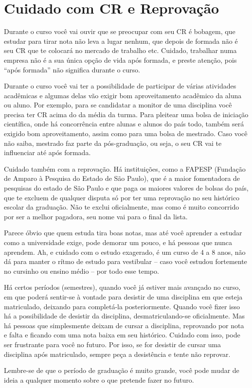 
\section{Cuidado com CR e Reprovação}

Durante o curso você vai ouvir que se preocupar com seu CR é bobagem, que
estudar para tirar nota não leva a lugar nenhum, que depois de formada não é
seu CR que te colocará no mercado de trabalho etc. Cuidado, trabalhar numa
empresa não é a sua única opção de vida após formada, e preste atenção, pois
``após formada'' não significa durante o curso.

Durante o curso você vai ter a possibilidade de participar de várias atividades
acadêmicas e algumas delas vão exigir bom aproveitamento acadêmico da aluna ou
aluno. Por exemplo, para se candidatar a monitor de uma disciplina você precisa
ter CR acima do da média da turma. Para pleitear uma bolsa de iniciação
científica, onde há concorrência entre alunas e alunos do país todo, também
será exigido bom aproveitamento, assim como para uma bolsa de mestrado. Caso
você não saiba, mestrado faz parte da pós-graduação, ou seja, o seu CR vai te
influenciar até após formada.

Cuidado também com a reprovação. Há instituições, como a FAPESP (Fundação de
Amparo à Pesquisa do Estado de São Paulo), que é a maior fomentadora de
pesquisas do estado de São Paulo e que paga os maiores valores de bolsas do
país, que te excluem de qualquer disputa só por ter uma reprovação no seu
histórico escolar da graduação. Não te exclui oficialmente, mas como é muito
concorrido por ser a melhor pagadora, seu nome vai para o final da lista.

Parece óbvio que quem estuda tira boas notas, mas até você aprender a estudar
como a universidade exige, pode demorar um pouco, e há pessoas que nunca
aprendem. Ah, e cuidado com o estudo exagerado, é um curso de 4 a 8 anos, não
dá para manter o rítmo de estudo para vestibular -- caso você estudou
fortemente no cursinho ou ensino médio -- por todo esse tempo.

Há certos períodos (semestres), quando você já estiver mais avançado no curso,
em que poderá sentir-se à vontade para desistir de uma disciplina em que esteja
matriculado, deixando para completá-la posteriormente. Quando você fizer isso
há a possibilidade de desistir da disciplina, desmatriculando-se oficialmente.
Mas há pessoas que simplesmente deixam de cursar a disciplina, reprovando por
nota e falta e ficando com uma nota baixa em seu histórico. Cuidado com isso,
pode ser frustrante para você no futuro. Por isso, se for desistir de cursar
uma disciplina após matriculado, sempre peça a desistência e tente não
reprovar.

Lembre-se de que o período de graduação é muito grande, você pode mudar de
ideia a qualquer momento sobre o que pretende fazer no futuro.
